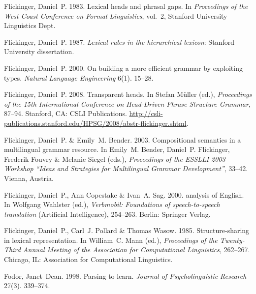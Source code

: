 \begin{thebibliography}{1420}
Flickinger, Daniel~P. 1983.
\newblock Lexical heads and phrasal gaps.
\newblock In \emph{Proceedings of the {West Coast Conference on Formal
  Linguistics}}, vol.~2, Stanford University Linguistics Dept.

Flickinger, Daniel~P. 1987.
\newblock \emph{Lexical rules in the hierarchical lexicon}: Stanford University
  dissertation.

Flickinger, Daniel~P. 2000.
\newblock On building a more efficient grammar by exploiting types.
\newblock \emph{Natural Language Engineering} 6(1). 15--28.

Flickinger, Daniel~P. 2008.
\newblock Transparent heads.
\newblock In Stefan M{\"u}ller (ed.), \emph{Proceedings of the {15th
  International Conference on Head-Driven Phrase Structure Grammar}}, 87--94.
  Stanford, CA: CSLI Publications.
\newblock
  \urlprefix\url{http://csli-publications.stanford.edu/HPSG/2008/abstr-flickinger.shtml}.

Flickinger, Daniel~P. \& Emily~M. Bender. 2003.
\newblock Compositional semantics in a multilingual grammar resource.
\newblock In Emily~M. Bender, Daniel~P. Flickinger, Frederik Fouvry \& Melanie
  Siegel (eds.), \emph{Proceedings of the {ESSLLI 2003 Workshop ``Ideas and
  Strategies for Multilingual Grammar Development''}}, 33--42. Vienna, Austria.

Flickinger, Daniel~P., Ann Copestake \& Ivan~A. Sag. 2000.
 analysis of {English}.
\newblock In Wolfgang Wahlster (ed.), \emph{Verbmobil: {Foundations} of
  speech-to-speech translation}  (Artificial Intelligence), 254--263. Berlin:
  Springer Verlag.

Flickinger, Daniel~P., Carl~J. Pollard \& Thomas Wasow. 1985.
\newblock Structure-sharing in lexical representation.
\newblock In William~C. Mann (ed.), \emph{Proceedings of the {Twenty-Third
  Annual Meeting of the Association for Computational Linguistics}}, 262--267.
  Chicago, IL: Association for Computational Linguistics.

Fodor, Janet~Dean. 1998{}.
\newblock Parsing to learn.
\newblock \emph{Journal of Psycholinguistic Research} 27(3). 339--374.


\end{thebibliography}
